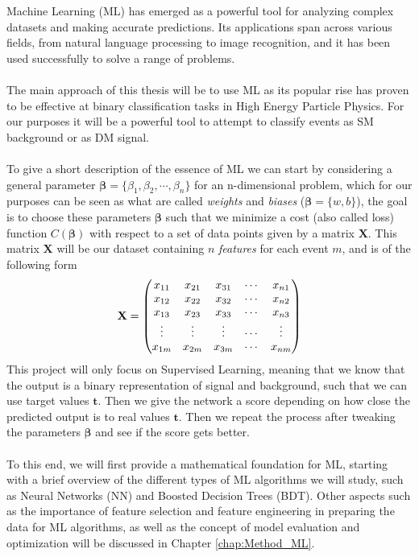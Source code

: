 \documentclass[12pt, a4paper]{book}
\begin{document}
Machine Learning (ML) has emerged as a powerful tool for analyzing complex datasets and making accurate predictions. Its applications span across various fields, from natural language processing to image recognition, and it has been used successfully to solve a range of problems. \\
\\The main approach of this thesis will be to use ML as its popular rise has proven to be effective at binary classification tasks \cite{Baldi_2016, DeepLearing} in High Energy Particle Physics. 
For our purposes it will be a powerful tool to attempt to classify events as SM background or as DM signal.\\
\\To give a short description of the essence of ML we can start by considering a general parameter $\bm{\beta} = \{\beta_1,\beta_2,\cdots,\beta_n\}$ for an n-dimensional problem, which for our purposes can be seen as what are called \textit{weights} and \textit{biases} 
($\bm \beta = \{w, b\}$), 
the goal is to choose these parameters $\bm{\beta}$ such that we minimize a cost (also called loss) function $C(\bm{\beta})$ with respect to a set of data points given by a matrix $\mathbf{X}$. This matrix $\mathbf{X}$ will be 
our dataset containing $n$ \textit{features} for each event $m$, and is of the following form 
\begin{equation}\label{eq:dataset}
    \bf X = \begin{pmatrix}
        x_{11} & x_{21} & x_{31} & \cdots & x_{n1}\\
        x_{12} & x_{22} & x_{32} & \cdots & x_{n2}\\
        x_{13} & x_{23} & x_{33} & \cdots & x_{n3}\\
        \vdots & \vdots & \vdots & \cdots & \vdots\\
        x_{1m} & x_{2m} & x_{3m} & \cdots & x_{nm}\\  
    \end{pmatrix}    
\end{equation}
This project will only focus on Supervised Learning, meaning that we know that the output is a binary representation of signal and background, such that we can use target values $\bm{t}$. 
Then we give the network a score depending on how close the predicted output is to real values $\bm t $. Then we repeat the process after tweaking the parameters $\bm \beta $ and see if the score gets better.\\
\\To this end, we will first provide a mathematical foundation for ML, starting with a brief overview of the different types of ML algorithms we will study, such as Neural Networks (NN) and Boosted Decision Trees (BDT). 
Other aspects such as the importance of feature selection and feature engineering in preparing the data for ML algorithms, as well as the concept of model evaluation and optimization will be discussed in Chapter \ref{chap:Method_ML}.
\end{document}
